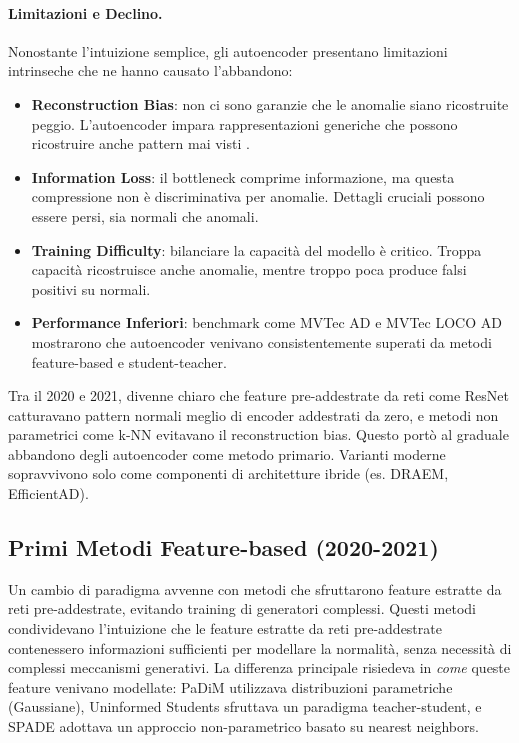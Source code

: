 \paragraph{Limitazioni e Declino.}

Nonostante l'intuizione semplice, gli autoencoder presentano limitazioni intrinseche che ne hanno causato l'abbandono:

\begin{itemize}
\item \textbf{Reconstruction Bias}: non ci sono garanzie che le anomalie siano ricostruite peggio. L'autoencoder impara rappresentazioni generiche che possono ricostruire anche pattern mai visti \cite{bergmann2019mvtec}.

\item \textbf{Information Loss}: il bottleneck comprime informazione, ma questa compressione non è discriminativa per anomalie. Dettagli cruciali possono essere persi, sia normali che anomali.

\item \textbf{Training Difficulty}: bilanciare la capacità del modello è critico. Troppa capacità ricostruisce anche anomalie, mentre troppo poca produce falsi positivi su normali.

\item \textbf{Performance Inferiori}: benchmark come MVTec AD e MVTec LOCO AD mostrarono che autoencoder venivano consistentemente superati da metodi feature-based e student-teacher.
\end{itemize}

Tra il 2020 e 2021, divenne chiaro che feature pre-addestrate da reti come ResNet catturavano pattern normali meglio di encoder addestrati da zero, e metodi non parametrici come k-NN evitavano il reconstruction bias. Questo portò al graduale abbandono degli autoencoder come metodo primario. Varianti moderne sopravvivono solo come componenti di architetture ibride (es. DRAEM, EfficientAD).

\subsection{Primi Metodi Feature-based (2020-2021)}
\label{subsec:metodi-feature-based}

Un cambio di paradigma avvenne con metodi che sfruttarono feature estratte da reti pre-addestrate, evitando training di generatori complessi. Questi metodi condividevano l'intuizione che le feature estratte da reti pre-addestrate contenessero informazioni sufficienti per modellare la normalità, senza necessità di complessi meccanismi generativi. La differenza principale risiedeva in \textit{come} queste feature venivano modellate: PaDiM utilizzava distribuzioni parametriche (Gaussiane), Uninformed Students sfruttava un paradigma teacher-student, e SPADE adottava un approccio non-parametrico basato su nearest neighbors.

